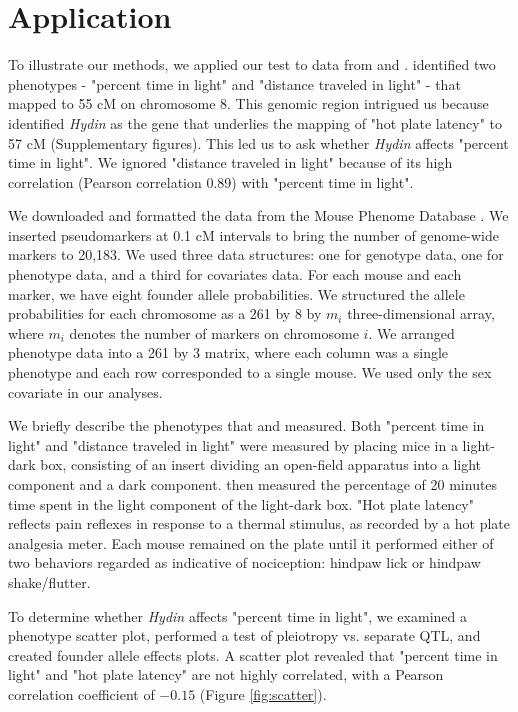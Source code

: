 \documentclass[12pt,twoside, lineno]{gsajnl}
\begin{document}
\section{Application}
\label{sec:app}

To illustrate our methods, we applied our test to data from \citet{logan2013high} and \citet{recla2014precise}. \citet{logan2013high} identified two phenotypes - "percent time in light" and "distance traveled in light" - that mapped to 55 cM on chromosome 8. This genomic region intrigued us because \citet{recla2014precise} identified \textit{Hydin} as the gene that underlies the mapping of "hot plate latency" to 57 cM (Supplementary figures). This led us to ask whether \textit{Hydin} affects "percent time in light". We ignored "distance traveled in light" because of its high correlation (Pearson correlation 0.89) with "percent time in light".




We downloaded and formatted the data from the Mouse Phenome Database \citep{bogue2015collaborative}. We inserted pseudomarkers at 0.1 cM intervals to bring the number of genome-wide markers to 20,183. We used three data structures: one for genotype data, one for phenotype data, and a third for covariates data. For each mouse and each marker, we have eight founder allele probabilities. We structured the allele probabilities for each chromosome as a 261 by 8 by $m_i$ three-dimensional array, where $m_i$ denotes the number of markers on chromosome $i$. We arranged phenotype data into a 261 by 3 matrix, where each column was a single phenotype and each row corresponded to a single mouse. We used only the sex covariate in our analyses.

We briefly describe the phenotypes that \citet{logan2013high} and \citet{recla2014precise} measured. Both "percent time in light" and "distance traveled in light" were measured by placing mice in a light-dark box, consisting of an insert dividing an open-field apparatus into a light component and a dark component. \citet{logan2013high} then measured the percentage of 20 minutes time spent in the light component of the light-dark box. "Hot plate latency" reflects pain reflexes in response to a thermal stimulus, as recorded by a hot plate analgesia meter. Each mouse remained on the plate until it performed either of two behaviors regarded as indicative of nociception: hindpaw lick or hindpaw shake/flutter.




To determine whether \textit{Hydin} affects "percent time in light", we examined a phenotype scatter plot, performed a test of pleiotropy vs. separate QTL, and created founder allele effects plots. A scatter plot revealed that "percent time in light" and "hot plate latency" are not highly correlated, with a Pearson correlation coefficient of $-0.15$ (Figure \ref{fig:scatter}).
\end{document}
